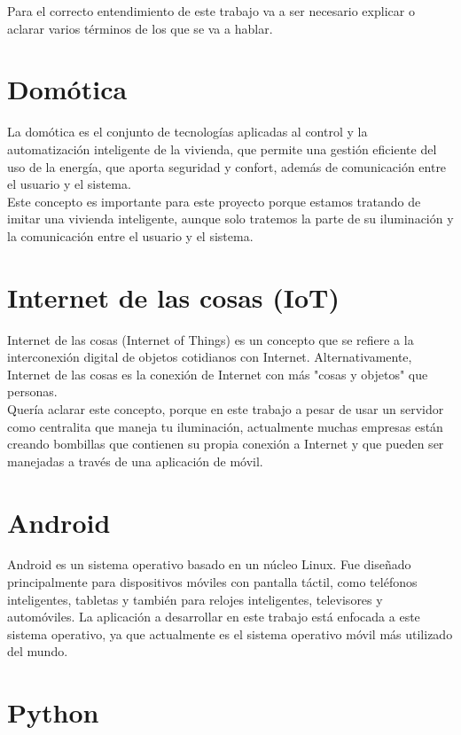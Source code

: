 
Para el correcto entendimiento de este trabajo va a ser necesario explicar o aclarar varios términos de los que se va a hablar.

\section{Domótica}

La domótica \cite{cedom:domotica} es el conjunto de tecnologías aplicadas al control y la automatización inteligente de la vivienda, que permite una gestión eficiente del uso de la energía, que aporta seguridad y confort, además de comunicación entre el usuario y el sistema. \\
Este concepto es importante para este proyecto porque estamos tratando de imitar una vivienda inteligente, aunque solo tratemos la parte de su iluminación y la comunicación entre el usuario y el sistema. 

\section{Internet de las cosas (IoT)}

Internet de las cosas (Internet of Things) \cite{wiki:iot} es un concepto que se refiere a la interconexión digital de objetos cotidianos con Internet. Alternativamente, Internet de las cosas es la conexión de Internet con más "cosas y objetos" que personas. \\
Quería aclarar este concepto, porque en este trabajo a pesar de usar un servidor como centralita que maneja tu iluminación, actualmente muchas empresas están creando bombillas que contienen su propia conexión a Internet y que pueden ser manejadas a través de una aplicación de móvil.

\section{Android}

Android \cite{wiki:android} es un sistema operativo basado en un núcleo Linux. Fue diseñado principalmente para dispositivos móviles con pantalla táctil, como teléfonos inteligentes, tabletas y también para relojes inteligentes, televisores y automóviles.
La aplicación a desarrollar en este trabajo está enfocada a este sistema operativo, ya que actualmente es el sistema operativo móvil más utilizado del mundo.

\section{Python}

